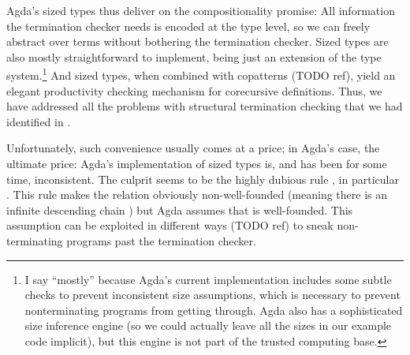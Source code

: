 Agda's sized types thus deliver on the compositionality promise: All information
the termination checker needs is encoded at the type level, so we can freely
abstract over terms without bothering the termination checker. Sized types are
also mostly straightforward to implement, being just an extension of the type
system.\footnote{I say \enquote{mostly} because Agda's current implementation
  includes some subtle checks to prevent inconsistent size assumptions, which is
  necessary to prevent nonterminating programs from getting through. Agda also
  has a sophisticated size inference engine (so we could actually leave all the
  sizes in our example code implicit), but this engine is not part of the
  trusted computing base.} And sized types, when combined with copatterns (TODO
ref), yield an elegant productivity checking mechanism for corecursive
definitions. Thus, we have addressed all the problems with structural
termination checking that we had identified in
.

Unfortunately, such convenience usually comes at a price; in Agda's case, the
ultimate price: Agda's implementation of sized types is, and has been for some
time, inconsistent. The culprit seems to be the highly dubious rule , in particular . This rule makes the \icode{<} relation
obviously non-well-founded (meaning there is an infinite descending chain
) but Agda assumes that \icode{<} is well-founded. This
assumption can be exploited in different ways (TODO ref) to sneak
non-terminating programs past the termination checker.
